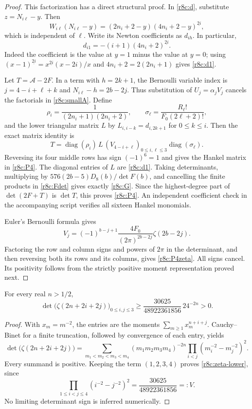 \begin{proof}
This factorization has a direct structural proof. In
\eqref{r8c:d}, substitute $z=N_{i\ell}-y$. Then
\[
 W_{i\ell}(N_{i\ell}-y)
    =(2n_i+2-y)(4n_i+2-y)^{\underline{2i}},
\]
which is independent of $\ell$. Write its Newton coefficients as
$d_{ih}$. In particular,
\begin{equation}\label{r8c:d1}
 d_{i1}=-(i+1)(4n_i+2)^{\underline{2i}}.
\end{equation}
Indeed the coefficient is the value at $y=1$ minus the value at
$y=0$; using
$(x-1)^{\underline{2i}}=x^{\underline{2i}}(x-2i)/x$
and $4n_i+2=2(2n_i+1)$ gives \eqref{r8c:d1}.

Let $T=\mathcal A-2F$. In a term with $h=2k+1$, the Bernoulli
variable index is $j=4-i+\ell+k$ and
$N_{i\ell}-h=2b-2j$. Thus substitution of $U_j=\alpha_jV_j$
cancels the factorials in \eqref{r8c:smallA}. Define
\[
 \rho_i=\frac1{(2n_i+1)(2n_i+2)},\qquad
 \sigma_\ell=\frac{R_\ell!}{F_0(2\ell+2)!},
\]
and the lower triangular matrix $L$ by
$L_{i,i-k}=d_{i,2k+1}$ for $0\le k\le i$.
Then the exact matrix identity is
\[
 T=\operatorname{diag}(\rho_i)\,L\,
       (V_{4-i+\ell})_{0\le i,\ell\le3}
       \operatorname{diag}(\sigma_\ell).
\]
Reversing its four middle rows has sign $(-1)^6=1$ and gives
the Hankel matrix in \eqref{r8c:P4}. The diagonal entries of $L$
are \eqref{r8c:d1}. Taking determinants, multiplying by
$576(2b-5)D_8(b)/\det F(b)$, and cancelling the finite products
in \eqref{r8c:Fdet} gives exactly \eqref{r8c:G}.
Since the highest-degree part of $\det(2F+T)$ is $\det T$,
this proves \eqref{r8c:P4}. An independent coefficient check in the
accompanying script verifies all sixteen Hankel monomials.

Euler's Bernoulli formula \cite[Eq. 24.8.1]{DLMF} gives
\[
 V_j=(-1)^{b-j+1}\frac{4F_0}{(2\pi)^{2b-2j}}
                     \zeta(2b-2j).
\]
Factoring the row and column signs and powers of $2\pi$ in the
determinant, and then reversing both its rows and its columns,
gives \eqref{r8c:P4zeta}. All signs cancel. Its positivity follows
from the strictly positive moment representation proved next.
\end{proof}

\begin{lemma}\label{r8c:positive}
For every real $n>1/2$,
\begin{equation}\label{r8c:zeta-lower}
 \det\bigl(\zeta(2n+2i+2j)\bigr)_{0\le i,j\le3}
 \ge \frac{30625}{48922361856}\,24^{-2n}>0.
\end{equation}
\end{lemma}
\begin{proof}
With $x_m=m^{-2}$, the entries are the moments
$\sum_{m\ge1}x_m^{n+i+j}$. Cauchy--Binet for a finite truncation,
followed by convergence of each entry, yields
\[
 \det\bigl(\zeta(2n+2i+2j)\bigr)
 =\sum_{m_1<m_2<m_3<m_4}
   (m_1m_2m_3m_4)^{-2n}
   \prod_{i<j}(m_i^{-2}-m_j^{-2})^2.
\]
Every summand is positive. Keeping the term $(1,2,3,4)$ proves
\eqref{r8c:zeta-lower}, since
\[
 \prod_{1\le i<j\le4}(i^{-2}-j^{-2})^2
       =\frac{30625}{48922361856}=:V.
\]
No limiting determinant sign is inferred numerically.
\end{proof}

